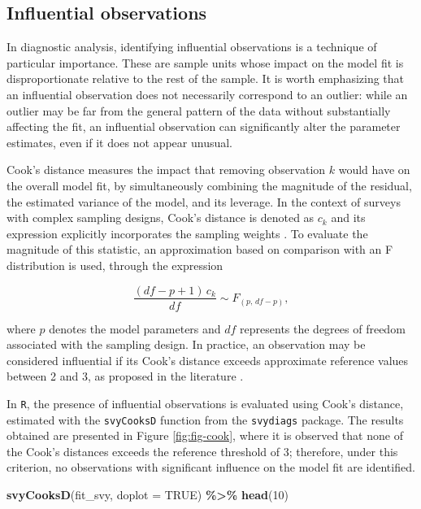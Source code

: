 \documentclass[
  english,
  12pt,
]{book}
\newenvironment{Shaded}{\begin{snugshade}}{\end{snugshade}}
\newcommand{\AttributeTok}[1]{\textcolor[rgb]{0.13,0.29,0.53}{#1}}
\newcommand{\ConstantTok}[1]{\textcolor[rgb]{0.56,0.35,0.01}{#1}}
\newcommand{\DecValTok}[1]{\textcolor[rgb]{0.00,0.00,0.81}{#1}}
\newcommand{\FunctionTok}[1]{\textcolor[rgb]{0.13,0.29,0.53}{\textbf{#1}}}
\newcommand{\NormalTok}[1]{#1}
\newcommand{\SpecialCharTok}[1]{\textcolor[rgb]{0.81,0.36,0.00}{\textbf{#1}}}
\begin{document}
\subsection{Influential observations}\label{observaciones-influyentes}

In diagnostic analysis, identifying influential observations is a technique of particular importance. These are sample units whose impact on the model fit is disproportionate relative to the rest of the sample. It is worth emphasizing that an influential observation does not necessarily correspond to an outlier: while an outlier may be far from the general pattern of the data without substantially affecting the fit, an influential observation can significantly alter the parameter estimates, even if it does not appear unusual.

Cook's distance measures the impact that removing observation \(k\) would have on the overall model fit, by simultaneously combining the magnitude of the residual, the estimated variance of the model, and its leverage. In the context of surveys with complex sampling designs, Cook's distance is denoted as \(c_k\) and its expression explicitly incorporates the sampling weights \citep[page 213]{heeringa2017applied}. To evaluate the magnitude of this statistic, an approximation based on comparison with an F distribution is used, through the expression

\[
\frac{(df-p+1)\,c_{k}}{df} \sim F_{(p,\,df-p)},
\]

where \(p\) denotes the model parameters and \(df\) represents the degrees of freedom associated with the sampling design. In practice, an observation may be considered influential if its Cook's distance exceeds approximate reference values between 2 and 3, as proposed in the literature \citep{heeringa2017applied}.

In \texttt{R}, the presence of influential observations is evaluated using Cook's distance, estimated with the \texttt{svyCooksD} function from the \texttt{svydiags} package. The results obtained are presented in Figure \ref{fig:fig-cook}, where it is observed that none of the Cook's distances exceeds the reference threshold of 3; therefore, under this criterion, no observations with significant influence on the model fit are identified.

\begin{Shaded}
\begin{Highlighting}[]
\FunctionTok{svyCooksD}\NormalTok{(fit\_svy, }\AttributeTok{doplot =} \ConstantTok{TRUE}\NormalTok{) }\SpecialCharTok{\%\textgreater{}\%}
  \FunctionTok{head}\NormalTok{(}\DecValTok{10}\NormalTok{)}
\end{Highlighting}
\end{Shaded}
\end{document}
